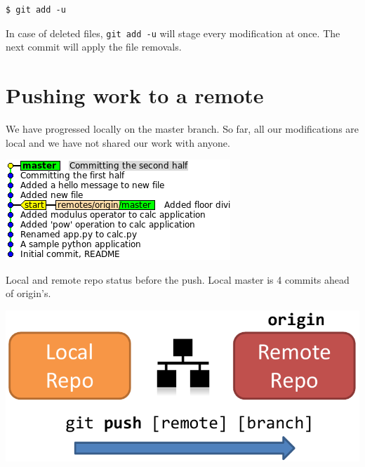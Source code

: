 \documentclass{../../common/tufte-latex/tufte-handout}
\begin{document}
\begin{lstlisting}[style=BashInputStyle]
  $ git add -u
\end{lstlisting}

In case of deleted files, \texttt{git add -u} will stage every modification at once.
The next commit will apply the file removals.

\pagebreak

\section{Pushing work to a remote}

We have progressed locally on the master branch.
So far, all our modifications are local and we have not shared our work with anyone.

\begin{marginfigure}%
  \centering
  \includegraphics[width=\linewidth]{gitcommit-pre-push.png}
  \label{fig:gitcommit-pre-push}
  \caption{Local and remote repo status before the push. Local master is 4 commits ahead of origin's.}
\end{marginfigure}
\begin{marginfigure}%
  \centering
  \includegraphics[width=\linewidth]{gitpush-schema.pdf}
  \label{fig:gitpush-schema}
\end{marginfigure}
\end{document}

